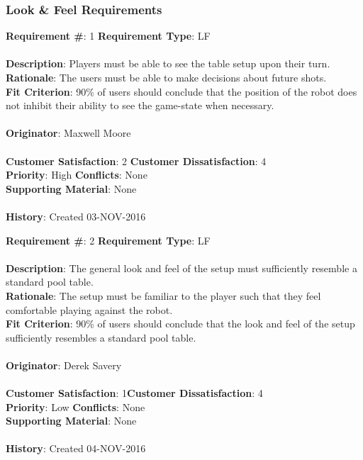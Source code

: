 \documentclass[titlepage]{article}
\begin{document}
\subsubsection{Look \& Feel Requirements}
\begin{framed}
	\noindent\textbf{Requirement \#}: 1 \hfill \textbf{Requirement Type}: LF \hfill\\\\
	\noindent\textbf{Description}: Players must be able to see the table setup upon their turn.\\
	\textbf{Rationale}: The users must be able to make decisions about future shots.\\
	\textbf{Fit Criterion}: 90\% of users should conclude that the position of the robot does not inhibit their ability to see the game-state when necessary.\\\\
	\textbf{Originator}: Maxwell Moore\\\\
	\noindent\textbf{Customer Satisfaction}: 2 \hfill 	\textbf{Customer Dissatisfaction}: 4 \hfill\\
	\textbf{Priority}: High \hfill \textbf{Conflicts}: None \hfill\\
	\textbf{Supporting Material}: None\\\\
	\noindent\textbf{History}: Created 03-NOV-2016
\end{framed}

\begin{framed}
	\noindent\textbf{Requirement \#}: 2 \hfill \textbf{Requirement Type}: LF \hfill\\\\
	\noindent\textbf{Description}: The general look and feel of the setup must sufficiently resemble a standard pool table.\\
	\textbf{Rationale}: The setup must be familiar to the player such that they feel comfortable playing against the robot. \\
	\textbf{Fit Criterion}: 90\% of users should conclude that the look and feel of the setup sufficiently resembles a standard pool table.\\\\
	\textbf{Originator}: Derek Savery\\\\
	\noindent\textbf{Customer Satisfaction}: 1\hfill 	\textbf{Customer Dissatisfaction}: 4 \hfill\\
	\textbf{Priority}: Low \hfill \textbf{Conflicts}: None \hfill\\
	\textbf{Supporting Material}: None\\\\
	\noindent\textbf{History}: Created 04-NOV-2016
\end{framed}
\end{document}
